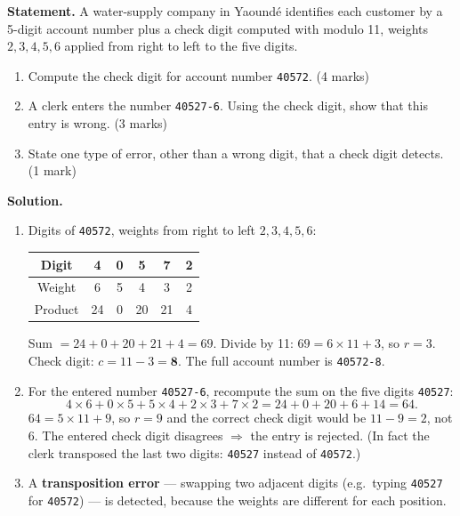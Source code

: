\documentclass[11pt]{article}
\begin{document}
\begin{exoresolu}
\textbf{Statement.} A water-supply company in Yaoundé identifies each customer by a 5-digit account number plus a check digit computed with modulo 11, weights $2,3,4,5,6$ applied from right to left to the five digits.
\begin{enumerate}
\item[a)] Compute the check digit for account number \texttt{40572}. \hfill (4 marks)
\item[b)] A clerk enters the number \texttt{40527-6}. Using the check digit, show that this entry is wrong. \hfill (3 marks)
\item[c)] State one type of error, other than a wrong digit, that a check digit detects. \hfill (1 mark)
\end{enumerate}
\tcblower
\textbf{Solution.}
\begin{enumerate}
\item[a)] Digits of \texttt{40572}, weights from right to left $2,3,4,5,6$:
\begin{center}
\begin{tabular}{|c|c|c|c|c|c|}
\hline
\rowcolor{popblueL} Digit & 4 & 0 & 5 & 7 & 2 \\
\hline
\rowcolor{popblueL} Weight & 6 & 5 & 4 & 3 & 2 \\
\hline
Product & 24 & 0 & 20 & 21 & 4 \\
\hline
\end{tabular}
\end{center}
Sum $= 24+0+20+21+4 = 69$. Divide by 11: $69 = 6 \times 11 + 3$, so $r = 3$.
Check digit: $c = 11 - 3 = \mathbf{8}$. The full account number is \texttt{40572-8}.
\item[b)] For the entered number \texttt{40527-6}, recompute the sum on the five digits \texttt{40527}:
\[ 4\times 6 + 0\times 5 + 5\times 4 + 2\times 3 + 7\times 2 = 24+0+20+6+14 = 64. \]
$64 = 5\times 11 + 9$, so $r = 9$ and the correct check digit would be $11-9 = 2$, not $6$. The entered check digit disagrees $\Rightarrow$ the entry is rejected. (In fact the clerk transposed the last two digits: \texttt{40527} instead of \texttt{40572}.)
\item[c)] A \textbf{transposition error} — swapping two adjacent digits (e.g.\ typing \texttt{40527} for \texttt{40572}) — is detected, because the weights are different for each position.
\end{enumerate}
\end{exoresolu}
\end{document}
